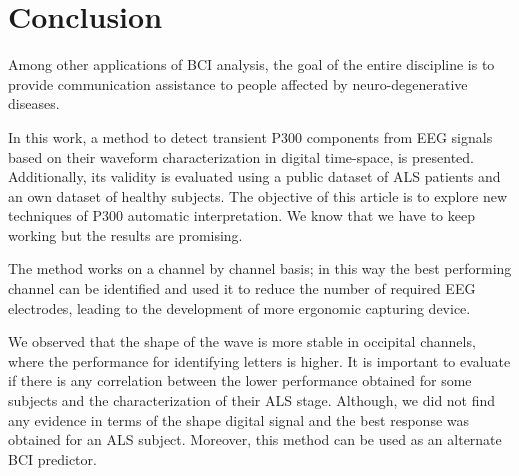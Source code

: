 \documentclass[entropy,article,submit,moreauthors,pdftex,10pt,a4paper]{mdpi}
\begin{document}
\section{Conclusion}
\label{conclusion}



Among other applications of BCI analysis, the goal of the entire discipline is to provide communication assistance to people affected by neuro-degenerative diseases.

In this work, a method to detect transient P300 components from EEG signals based on their waveform characterization in digital time-space, is presented.  Additionally, its validity is evaluated using a public dataset of ALS patients and an own dataset of healthy subjects. The objective of this article is to explore new techniques of P300 automatic interpretation.  
We know that we have to keep working but the results are promising. 

The method works on a channel by channel basis; in this way the best performing channel can be identified and used it to reduce the number of required EEG electrodes, leading to the development of more ergonomic capturing device.

We observed that the shape of the wave is more stable in occipital channels, where the performance for identifying letters is higher.   %
It is important to evaluate if there is any correlation between the lower performance obtained for some subjects and the characterization of their ALS stage.  Although,  we did not find any evidence in terms of the shape digital signal and the best response was obtained for an ALS subject.  Moreover, this method can be used as an alternate BCI predictor.  
\end{document}
